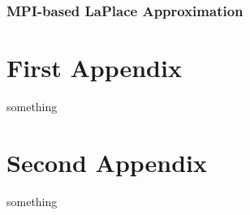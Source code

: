 \documentclass[]{article}
\begin{document}
\subsection{MPI-based LaPlace Approximation}

\begin{appendices}
	\chapter{First Appendix}
	something
	\chapter{Second Appendix}
	something
\end{appendices}
\end{document}
